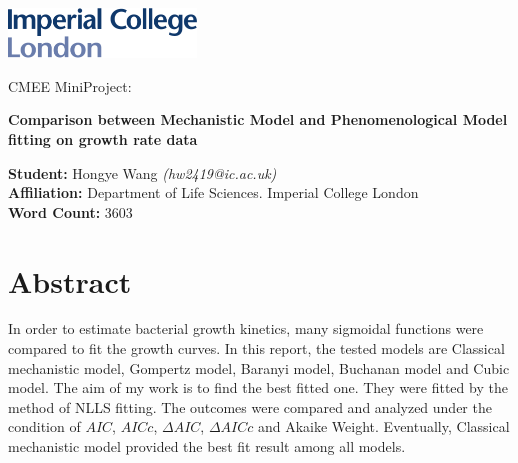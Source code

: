 \documentclass[11pt]{article}
\begin{document}
	\begin{titlepage}
		
		\includegraphics[width = 5cm]{../results/images/imperial.pdf}
		
		\begin{center}
			
		\vspace*{2cm}
		\LARGE
		CMEE MiniProject:
		
		\vspace*{3cm}
		\Huge
		\textbf{Comparison between Mechanistic Model and Phenomenological Model fitting on growth rate data}\\
		
		\vspace{5cm}
		\Large
		
		\textbf{Student:} Hongye Wang \textit{(hw2419@ic.ac.uk)}\\
		\vspace*{1cm}
		\textbf{Affiliation:} Department of Life Sciences. Imperial College London\\
		\vspace*{1cm}
		\textbf{Word Count:} 3603
		
		\vspace{2cm}
		
		\end{center}

	\end{titlepage}
	
\clearpage
\tableofcontents
	
	
\linenumbers
\doublespacing
\section{Abstract}
In order to estimate bacterial growth kinetics, many sigmoidal functions were compared to fit the growth curves. In this report, the tested models are Classical mechanistic model, Gompertz model, Baranyi model, Buchanan model and Cubic model. The aim of my work is to find the best fitted one. They were fitted by the method of NLLS fitting. The outcomes were compared and analyzed under the condition of $AIC$, $AICc$, $\Delta$$AIC$, $\Delta$$AICc$ and Akaike Weight. Eventually, Classical mechanistic model provided the best fit result among all models. 
\end{document}
